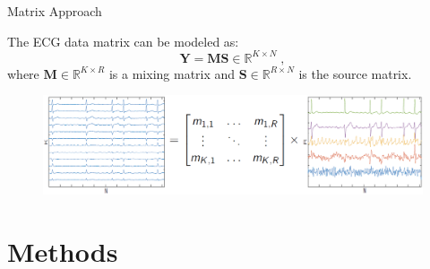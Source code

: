\documentclass{beamer}
\begin{document}
	\begin{frame}{Matrix Approach}
	
		The ECG data matrix can be modeled as:
		\begin{equation}
			\textbf{Y} = \textbf{MS} \in \mathbb{R}^{K \times N} \; ,
		\end{equation}
		where ${\textbf{M}} \in {\mathbb{R}}^{K \times R}$ is a mixing matrix and $\textbf{S} \in {\mathbb{R}}^{R \times N}$ is the source matrix.	
		\vspace{-0.4cm}
		\begin{figure}[htb]
			\centering
			\includegraphics[scale=0.5]{fig/CinC2020/bss_fig.png}
		\end{figure}
	\end{frame}
		

\section{Methods}
\end{document}

